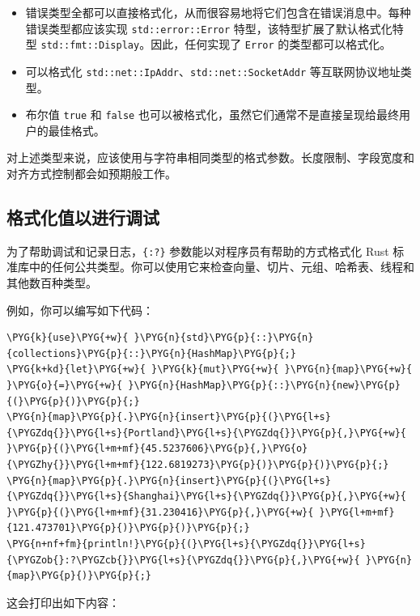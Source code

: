 \begin{itemize}
\item 错误类型全都可以直接格式化，从而很容易地将它们包含在错误消息中。每种错误类型都应该实现 \texttt{std::error::Error} 特型，该特型扩展了默认格式化特型 \texttt{std::fmt::Display}。因此，任何实现了 \texttt{Error} 的类型都可以格式化。
\item 可以格式化 \texttt{std::net::IpAddr}、\texttt{std::net::SocketAddr} 等互联网协议地址类型。
\item 布尔值 \texttt{true} 和 \texttt{false} 也可以被格式化，虽然它们通常不是直接呈现给最终用户的最佳格式。
\end{itemize}

对上述类型来说，应该使用与字符串相同类型的格式参数。长度限制、字段宽度和对齐方式控制都会如预期般工作。

\subsection{格式化值以进行调试}

为了帮助调试和记录日志，\texttt{\{:?\}} 参数能以对程序员有帮助的方式格式化 Rust 标准库中的任何公共类型。你可以使用它来检查向量、切片、元组、哈希表、线程和其他数百种类型。

例如，你可以编写如下代码：

\begin{Verbatim}[commandchars=\\\{\},breaklines=true,breakanywhere=true,fontsize=\codefont,xleftmargin=17bp]
\PYG{k}{use}\PYG{+w}{ }\PYG{n}{std}\PYG{p}{::}\PYG{n}{collections}\PYG{p}{::}\PYG{n}{HashMap}\PYG{p}{;}
\PYG{k+kd}{let}\PYG{+w}{ }\PYG{k}{mut}\PYG{+w}{ }\PYG{n}{map}\PYG{+w}{ }\PYG{o}{=}\PYG{+w}{ }\PYG{n}{HashMap}\PYG{p}{::}\PYG{n}{new}\PYG{p}{(}\PYG{p}{)}\PYG{p}{;}
\PYG{n}{map}\PYG{p}{.}\PYG{n}{insert}\PYG{p}{(}\PYG{l+s}{\PYGZdq{}}\PYG{l+s}{Portland}\PYG{l+s}{\PYGZdq{}}\PYG{p}{,}\PYG{+w}{ }\PYG{p}{(}\PYG{l+m+mf}{45.5237606}\PYG{p}{,}\PYG{o}{\PYGZhy{}}\PYG{l+m+mf}{122.6819273}\PYG{p}{)}\PYG{p}{)}\PYG{p}{;}
\PYG{n}{map}\PYG{p}{.}\PYG{n}{insert}\PYG{p}{(}\PYG{l+s}{\PYGZdq{}}\PYG{l+s}{Shanghai}\PYG{l+s}{\PYGZdq{}}\PYG{p}{,}\PYG{+w}{ }\PYG{p}{(}\PYG{l+m+mf}{31.230416}\PYG{p}{,}\PYG{+w}{ }\PYG{l+m+mf}{121.473701}\PYG{p}{)}\PYG{p}{)}\PYG{p}{;}
\PYG{n+nf+fm}{println!}\PYG{p}{(}\PYG{l+s}{\PYGZdq{}}\PYG{l+s}{\PYGZob{}:?\PYGZcb{}}\PYG{l+s}{\PYGZdq{}}\PYG{p}{,}\PYG{+w}{ }\PYG{n}{map}\PYG{p}{)}\PYG{p}{;}
\end{Verbatim}

这会打印出如下内容：

